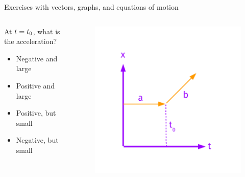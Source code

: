 \documentclass{beamer}
\begin{document}
\begin{frame}{Exercises with vectors, graphs, and equations of motion}
\begin{columns}[T]
\begin{column}{0.4\textwidth}
\small
At $t=t_{\rm 0}$, what is the acceleration?
\begin{itemize}
\item Negative and large
\item Positive and large
\item Positive, but small
\item Negative, but small
\end{itemize}
\end{column}
\begin{column}{0.6\textwidth}
\begin{figure}
\centering
\includegraphics[width=\textwidth,trim=0cm 0cm 0cm 1.5cm,clip=true]{figures/Vectors3.pdf}
\end{figure}
\end{column}
\end{columns}
\end{frame}
\end{document}
